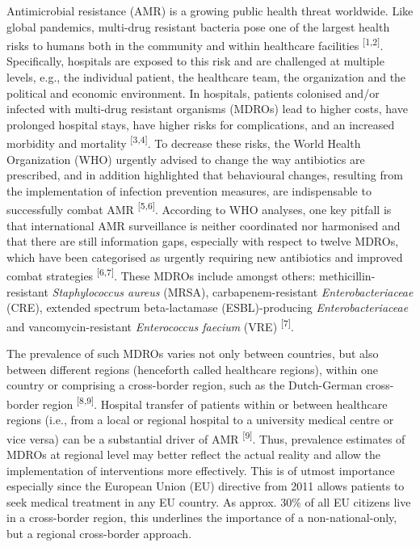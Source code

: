 \documentclass[
]{book}
\begin{document}
Antimicrobial resistance (AMR) is a growing public health threat worldwide. Like global pandemics, multi-drug resistant bacteria pose one of the largest health risks to humans both in the community and within healthcare facilities \textsuperscript{{[}1,2{]}}. Specifically, hospitals are exposed to this risk and are challenged at multiple levels, e.g., the individual patient, the healthcare team, the organization and the political and economic environment. In hospitals, patients colonised and/or infected with multi-drug resistant organisms (MDROs) lead to higher costs, have prolonged hospital stays, have higher risks for complications, and an increased morbidity and mortality \textsuperscript{{[}3,4{]}}. To decrease these risks, the World Health Organization (WHO) urgently advised to change the way antibiotics are prescribed, and in addition highlighted that behavioural changes, resulting from the implementation of infection prevention measures, are indispensable to successfully combat AMR \textsuperscript{{[}5,6{]}}. According to WHO analyses, one key pitfall is that international AMR surveillance is neither coordinated nor harmonised and that there are still information gaps, especially with respect to twelve MDROs, which have been categorised as urgently requiring new antibiotics and improved combat strategies \textsuperscript{{[}6,7{]}}. These MDROs include amongst others: methicillin-resistant \emph{Staphylococcus aureus} (MRSA), carbapenem-resistant \emph{Enterobacteriaceae} (CRE), extended spectrum beta-lactamase (ESBL)-producing \emph{Enterobacteriaceae} and vancomycin-resistant \emph{Enterococcus faecium} (VRE) \textsuperscript{{[}7{]}}.

The prevalence of such MDROs varies not only between countries, but also between different regions (henceforth called healthcare regions), within one country or comprising a cross-border region, such as the Dutch-German cross-border region \textsuperscript{{[}8,9{]}}. Hospital transfer of patients within or between healthcare regions (i.e., from a local or regional hospital to a university medical centre or vice versa) can be a substantial driver of AMR \textsuperscript{{[}9{]}}. Thus, prevalence estimates of MDROs at regional level may better reflect the actual reality and allow the implementation of interventions more effectively. This is of utmost importance especially since the European Union (EU) directive from 2011 allows patients to seek medical treatment in any EU country. As approx. 30\% of all EU citizens live in a cross-border region, this underlines the importance of a non-national-only, but a regional cross-border approach.
\end{document}
